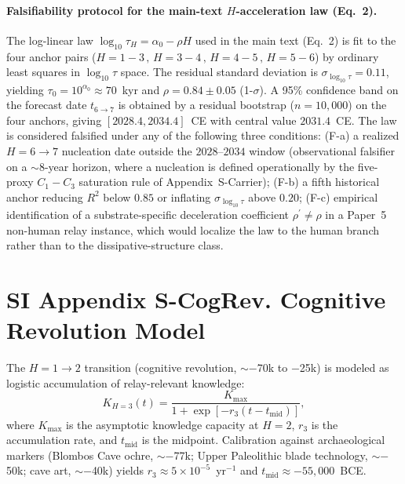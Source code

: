 \documentclass[11pt]{article}
\begin{document}
\paragraph{Falsifiability protocol for the main-text $H$-acceleration law (Eq.~2).}\label{sec:S-Acceleration-falsif}
The log-linear law $\log_{10}\tau_H=\alpha_0-\rho H$ used in the main text (Eq.~2) is fit to the four anchor pairs ($H{=}1{-}3\,,\,H{=}3{-}4\,,\,H{=}4{-}5\,,\,H{=}5{-}6$) by ordinary least squares in $\log_{10}\tau$ space. The residual standard deviation is $\sigma_{\log_{10}\tau}=0.11$, yielding $\tau_0=10^{\alpha_0}\approx 70$~kyr and $\rho=0.84\pm 0.05$ (1-$\sigma$). A 95\% confidence band on the forecast date $t_{6\to 7}$ is obtained by a residual bootstrap ($n=10{,}000$) on the four anchors, giving $[2028.4,2034.4]$~CE with central value $2031.4$~CE. The law is considered falsified under any of the following three conditions: (F-a) a realized $H{=}6\to 7$ nucleation date outside the $2028$--$2034$ window (observational falsifier on a $\sim 8$-year horizon, where a nucleation is defined operationally by the five-proxy $C_1{-}C_3$ saturation rule of Appendix~S-Carrier); (F-b) a fifth historical anchor reducing $R^2$ below $0.85$ or inflating $\sigma_{\log_{10}\tau}$ above $0.20$; (F-c) empirical identification of a substrate-specific deceleration coefficient $\rho^{\prime}\neq\rho$ in a Paper~5 non-human relay instance, which would localize the law to the human branch rather than to the dissipative-structure class.


\section*{SI Appendix S-CogRev. Cognitive Revolution Model}

The $H=1\to 2$ transition (cognitive revolution, $\sim -$70k to $-$25k) is modeled as logistic accumulation of relay-relevant knowledge:
\[
K_{H=3}(t) = \frac{K_{\max}}{1 + \exp[-r_3(t - t_{\mathrm{mid}})]},
\]
where $K_{\max}$ is the asymptotic knowledge capacity at $H=2$, $r_3$ is the accumulation rate, and $t_{\mathrm{mid}}$ is the midpoint.
Calibration against archaeological markers (Blombos Cave ochre, $\sim -$77k; Upper Paleolithic blade technology, $\sim -$50k; cave art, $\sim -$40k) yields $r_3 \approx 5 \times 10^{-5}$~yr$^{-1}$ and $t_{\mathrm{mid}} \approx -55{,}000$~BCE.
\end{document}
